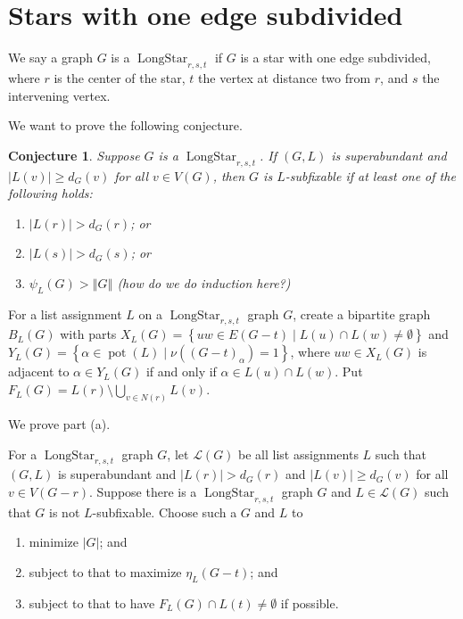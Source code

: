 \documentclass[12pt]{article}
\theoremstyle{plain}
\newtheorem{conjecture}[thm]{Conjecture}
\theoremstyle{definition}
\theoremstyle{remark}
\newcommand{\fancy}[1]{\mathcal{#1}}
\newcommand{\setb}[3]{\left\{ #1 \in #2 \mid #3 \right\}}
\newcommand{\size}[1]{\left\Vert#1\right\Vert}
\newcommand{\pot}{\operatorname{pot}}
\def\L{\fancy{L}}
\begin{document}
\section{Stars with one edge subdivided}
	We say a graph $G$ is a $\operatorname{LongStar}_{r,s,t}$ if $G$ is a star with one edge subdivided, where $r$ is the center of the
	star, $t$ the vertex at distance two from $r$, and $s$ the intervening vertex.  
	
	We want to prove the following conjecture.
	
\begin{conjecture}
	\label{StarWithOneEdgeSubdivided}
 	 Suppose $G$ is a $\operatorname{LongStar}_{r,s,t}$. If $(G,L)$ is superabundant and $|L(v)| \ge d_G(v)$ for all 
	 $v \in V(G)$, then $G$ is $L$-subfixable if at least one of the following holds:
	\begin{enumerate}
		\item[(a)] $|L(r)| > d_G(r)$; or
		\item[(b)] $|L(s)| > d_G(s)$; or
		\item[(c)] $\psi_L(G) > \size{G}$ (how do we do induction here?)
	\end{enumerate}
\end{conjecture}

For a list assignment $L$ on a $\operatorname{LongStar}_{r,s,t}$ graph $G$, create a bipartite graph $B_L(G)$ with parts $X_L(G) = \setb{uw}{E(G - t)}{L(u) \cap L(w) \ne \emptyset}$ and $Y_L(G) = \setb{\alpha}{\pot(L)}{\nu((G - t)_\alpha) = 1}$, where $uw \in X_L(G)$ is adjacent to $\alpha \in Y_L(G)$ if and only if $\alpha \in L(u) \cap L(w)$.  Put $F_L(G) = L(r) \setminus \bigcup_{v \in N(r)} L(v)$.

	
	We prove part (a). 
	
	
	For a $\operatorname{LongStar}_{r,s,t}$ graph $G$, let $\L(G)$ be all list assignments $L$ such that $(G,L)$ is superabundant and $|L(r)| > d_G(r)$ and $|L(v)| \ge d_G(v)$ for all $v \in V(G-r)$.  Suppose there is a $\operatorname{LongStar}_{r,s,t}$ graph $G$ and $L \in \L(G)$ such that $G$ is not $L$-subfixable.  Choose such a $G$ and $L$ to 
	
	\begin{enumerate}
		\item minimize $|G|$; and 
		\item subject to that to maximize $\eta_L(G - t)$; and
		\item subject to that to have $F_L(G) \cap L(t) \ne \emptyset$ if possible.
	\end{enumerate}
	
\end{document}
